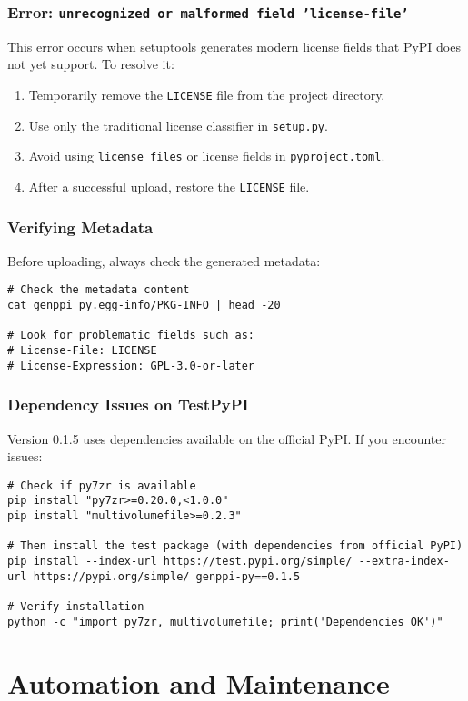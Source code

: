 \documentclass[11pt, a4paper]{article}
\begin{document}
\subsubsection{Error: \texttt{unrecognized or malformed field 'license-file'}}
This error occurs when setuptools generates modern license fields that PyPI does not yet support. To resolve it:
\begin{enumerate}
    \item Temporarily remove the \texttt{LICENSE} file from the project directory.
    \item Use only the traditional license classifier in \texttt{setup.py}.
    \item Avoid using \texttt{license\_files} or license fields in \texttt{pyproject.toml}.
    \item After a successful upload, restore the \texttt{LICENSE} file.
\end{enumerate}

\subsubsection{Verifying Metadata}
Before uploading, always check the generated metadata:
\begin{lstlisting}[style=bashstyle]
# Check the metadata content
cat genppi_py.egg-info/PKG-INFO | head -20

# Look for problematic fields such as:
# License-File: LICENSE
# License-Expression: GPL-3.0-or-later
\end{lstlisting}

\subsubsection{Dependency Issues on TestPyPI}
Version 0.1.5 uses dependencies available on the official PyPI. If you encounter issues:
\begin{lstlisting}[style=bashstyle]
# Check if py7zr is available
pip install "py7zr>=0.20.0,<1.0.0"
pip install "multivolumefile>=0.2.3"

# Then install the test package (with dependencies from official PyPI)
pip install --index-url https://test.pypi.org/simple/ --extra-index-url https://pypi.org/simple/ genppi-py==0.1.5

# Verify installation
python -c "import py7zr, multivolumefile; print('Dependencies OK')"
\end{lstlisting}

\section{Automation and Maintenance}
\end{document}
